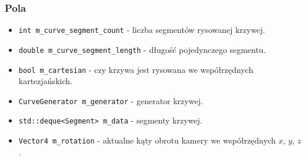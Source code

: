 			\subsubsection{Pola}
				\begin{itemize}
					\item \lstinline|int m_curve_segment_count| - liczba segmentów rysowanej krzywej.
					\item \lstinline|double m_curve_segment_length| - długość pojedynczego segmentu.
					\item \lstinline|bool m_cartesian| - czy krzywa jest rysowana we współrzędnych kartezjańskich.
					\item \lstinline|CurveGenerator m_generator| - generator krzywej.
					\item \lstinline|std::deque<Segment> m_data| - segmenty krzywej.
					\item \lstinline|Vector4 m_rotation| - aktualne kąty obrotu kamery we współrzędnych $x$, $y$, $z$. 

				\end{itemize}

